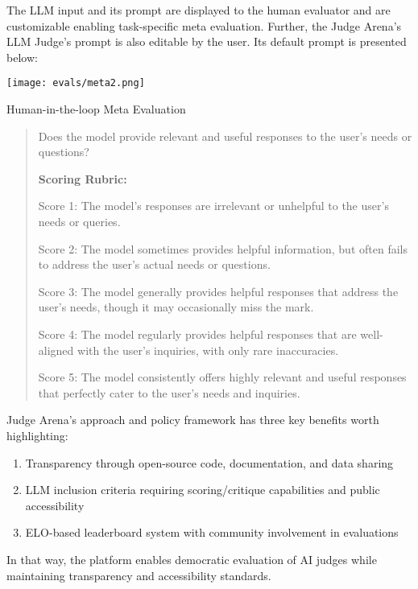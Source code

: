 %



The LLM input and its prompt are displayed to the human evaluator and are customizable enabling task-specific meta evaluation. Further, the Judge Arena's LLM Judge's prompt is also editable by the user. Its default prompt is presented below:
\begin{marginfigure}
\centering
\texttt{[image: evals/meta2.png]}
\caption{Human-in-the-loop Meta Evaluation}
\label{fig:meta2}
\end{marginfigure}
\begin{quote}
Does the model provide relevant and useful responses to the user's needs or questions?

\textbf{Scoring Rubric:}

Score 1: The model's responses are irrelevant or unhelpful to the user's needs or queries.

Score 2: The model sometimes provides helpful information, but often fails to address the user's actual needs or questions.

Score 3: The model generally provides helpful responses that address the user's needs, though it may occasionally miss the mark.

Score 4: The model regularly provides helpful responses that are well-aligned with the user's inquiries, with only rare inaccuracies.

Score 5: The model consistently offers highly relevant and useful responses that perfectly cater to the user's needs and inquiries.
\end{quote}

Judge Arena's approach and policy framework has three key benefits worth highlighting:
\begin{enumerate}
    \item Transparency through open-source code, documentation, and data sharing
    \item LLM inclusion criteria requiring scoring/critique capabilities and public accessibility
    \item ELO-based leaderboard system with community involvement in evaluations
\end{enumerate}

In that way, the platform enables democratic evaluation of AI judges while maintaining transparency and accessibility standards.

